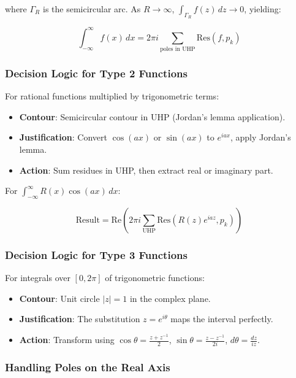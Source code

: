 \documentclass[conference]{IEEEtran}
\begin{document}
where $\Gamma_R$ is the semicircular arc. As $R \to \infty$, $\int_{\Gamma_R} f(z) \, dz \to 0$, yielding:

\begin{equation}
\int_{-\infty}^{\infty} f(x) \, dx = 2\pi i \sum_{\text{poles in UHP}} \text{Res}(f, p_k)
\end{equation}

\subsubsection{Decision Logic for Type 2 Functions}

For rational functions multiplied by trigonometric terms:

\begin{itemize}
    \item \textbf{Contour}: Semicircular contour in UHP (Jordan's lemma application).
    \item \textbf{Justification}: Convert $\cos(ax)$ or $\sin(ax)$ to $e^{iax}$, apply Jordan's lemma.
    \item \textbf{Action}: Sum residues in UHP, then extract real or imaginary part.
\end{itemize}

For $\int_{-\infty}^{\infty} R(x) \cos(ax) \, dx$:

\begin{equation}
\text{Result} = \text{Re}\left(2\pi i \sum_{\text{UHP}} \text{Res}(R(z)e^{iaz}, p_k)\right)
\end{equation}

\subsubsection{Decision Logic for Type 3 Functions}

For integrals over $[0, 2\pi]$ of trigonometric functions:

\begin{itemize}
    \item \textbf{Contour}: Unit circle $|z| = 1$ in the complex plane.
    \item \textbf{Justification}: The substitution $z = e^{i\theta}$ maps the interval perfectly.
    \item \textbf{Action}: Transform using $\cos\theta = \frac{z + z^{-1}}{2}$, $\sin\theta = \frac{z - z^{-1}}{2i}$, $d\theta = \frac{dz}{iz}$.
\end{itemize}

\subsubsection{Handling Poles on the Real Axis}
\end{document}
